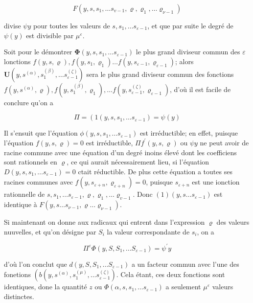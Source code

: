 \documentclass{article}
\begin{document}
\[
F\left(y, s, s_{1}, \ldots s_{v-1}, \varrho, \varrho_{1}, \ldots \varrho_{\nu-1}\right)
\]

divise \(\psi y\) pour toutes les valeurs de \(s, s_{1}, \ldots s_{\varepsilon-1}\), et que par suite le degré de \(\psi(y)\) est divisible par \(\mu^{\varepsilon}\).

Soit pour le démontrer \(\boldsymbol{\Phi}\left(y, s, s_{1}, \ldots s_{\varepsilon-1}\right)\) le plus grand diviseur commun des \(\varepsilon\) lonctions \(f(y, s, \varrho), f\left(y, s_{1}, \varrho_{1}\right) \ldots f\left(y, s_{\varepsilon-1}, \varrho_{\varepsilon-1}\right)\); alors \(\boldsymbol{U}\left(y, s^{(\alpha)}, s_{1}^{(\beta)}, \ldots s_{\varepsilon-1}^{(\zeta)}\right)\) sera le plus grand diviseur commun des fonctions \(f\left(y, s^{(\alpha)}, \varrho\right), f\left(y, s_{1}^{(\beta)}, \varrho_{1}\right), \ldots f\left(y, s_{\varepsilon-1}^{(\zeta)}, \varrho_{\varepsilon-1}\right)\), d'où il est facile de conclure qu'on a

\[
\Pi=\left(1\left(y, s, s_{1}, \ldots s_{\varepsilon-1}\right)=\psi(y)\right.
\]

Il s'ensuit que l'équation \(\phi\left(y, s, s_{1}, \ldots s_{\varepsilon-1}\right)\) est irréductible; en effet, puisque l'équation \(f(y, s, \varrho)=0\) est irréductible, \(\Pi f^{\prime}(y, s, \varrho)\) ou \(\psi y\) ne peut avoir de racine commune avec une équation d'un degré inoins élevé dont les coefficiens sont rationnels en \(\varrho\), ce qui aurait nécessairement lieu, si l'équation \(D\left(y, s, s_{1}, \ldots s_{\varepsilon-1}\right)=0\) ctait réductible. De plus cette équation a toutes ses racines communes avec \(f\left(y, s_{\varepsilon+n}, \varrho_{\varepsilon+n}\right)=0\), puisque \(s_{\varepsilon+n}\) est une ionction rationnelle de \(s, s_{1}, \ldots s_{\varepsilon-1}, \varrho, \varrho_{1}, \ldots \varrho_{v-1}\). Donc \((1)\left(y, s \ldots s_{\varepsilon-1}\right)\) est identique à \(F\left(y, s \ldots s_{\nu-1}, \varrho \ldots \varrho_{\nu-1}\right)\).

Si maintenant on donne aux radicaux qui entrent dans l'expression \(\varrho\) des valeurs nuuvelles, et qu'on désigne par \(S_{i}\) la valeur correspondante de \(s_{i}\), on a

\[
\Pi^{\varepsilon} \Phi\left(y, S, S_{1}, \ldots S_{\varepsilon-1}\right)=\psi^{\prime} y
\]

d'où l'on conclut que \(d\left(y, S, S_{1}, \ldots S_{\varepsilon-1}\right)\) a un facteur commun avec l'une des fonetions \(\left(b\left(y, s^{(\alpha)}, s_{1}^{(\mu)}, \ldots s_{\varepsilon-1}^{(\zeta)}\right)\right.\). Cela étant, ces deux fonctions sont identiques, done la quantité \(z\) ou \(\Phi\left(\alpha, s, s_{1}, \ldots s_{\varepsilon-1}\right)\) a seulement \(\mu^{\varepsilon}\) valeurs distinctes.
\end{document}

